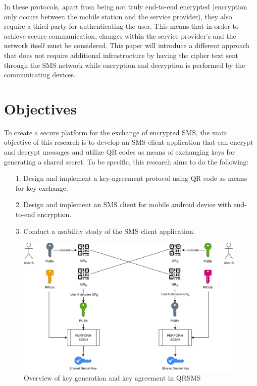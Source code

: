 \documentclass[journal]{./IEEE/IEEEtran}
\begin{document}
In these protocols, apart from being not truly end-to-end encrypted (encryption
only occurs between the mobile station and the service provider), they also
require a third party for authenticating the user. This means that in order to
achieve secure communication, changes within the service provider's and the
network itself must be considered. This paper will introduce a
different approach that does not require additional infrastructure by
having the cipher text sent through the SMS network while encryption and
decryption is performed by the communicating devices.

\section{Objectives}
To create a secure platform for the exchange of encrypted SMS, the main
objective of this research is to develop an SMS client application that
can encrypt and decrypt messages and utilize QR codes as means of
exchanging keys for generating a shared secret. To be specific, this research
aims to do the following:
\begin{itemize}
	\item[1.] Design and implement a key-agreement protocol using QR code
		as means for key exchange.
	\item[2.] Design and implement an SMS client for mobile android device  with
		end-to-end encryption.
	\item[3.] Conduct a usability study of the SMS client application.
\end{itemize}

\begin{figure}
	\centering
	\includegraphics[width=6in]{images/key_agreement.eps}
	\caption{Overview of key generation and key agreement in QRSMS}
	\label{key_genagree}
\end{figure}
\end{document}
